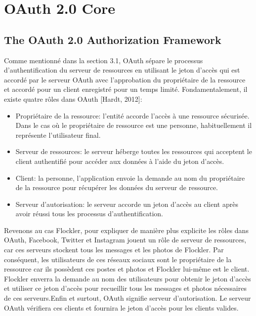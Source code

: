 \section{OAuth 2.0 Core}

\subsection{The OAuth 2.0 Authorization Framework}

Comme mentionné dans la section 3.1, OAuth sépare le processus d'authentification du serveur de ressources en utilisant le jeton d'accès qui est accordé par le serveur OAuth avec l'approbation du propriétaire de la ressource et accordé pour un client enregistré pour un temps limité. Fondamentalement, il existe quatre rôles dans OAuth [Hardt, 2012]:
\begin{itemize}
\item Propriétaire de la ressource: l'entité accorde l'accès à une ressource sécurisée. Dans le cas où le propriétaire de ressource est une personne, habituellement il représente l'utilisateur final.
\item Serveur de ressources: le serveur héberge toutes les ressources qui acceptent le client authentifié pour accéder aux données à l'aide du jeton d'accès.
\item Client: la personne, l'application envoie la demande au nom du propriétaire de la ressource pour récupérer les données du serveur de ressource.
\item Serveur d'autorisation: le serveur accorde un jeton d'accès au client après avoir réussi tous les processus d'authentification.
\end{itemize}
Revenons au cas Flockler,  pour expliquer de manière plus explicite les rôles dans OAuth, Facebook, Twitter et Instagram jouent un rôle de serveur de ressources, car ces serveurs stockent tous les messages et les photos de Flockler. Par conséquent, les utilisateurs de ces réseaux sociaux sont le propriétaire de la ressource car ils possèdent ces postes et photos et Flockler lui-même est le client. Flockler enverra la demande au nom des utilisateurs  pour obtenir le jeton d'accès et utiliser ce jeton d'accès pour recueillir tous les messages et photos nécessaires de ces serveurs.Enfin et surtout, OAuth signifie serveur d'autorisation. Le serveur OAuth vérifiera ces clients et fournira le jeton d'accès pour les clients valides.

